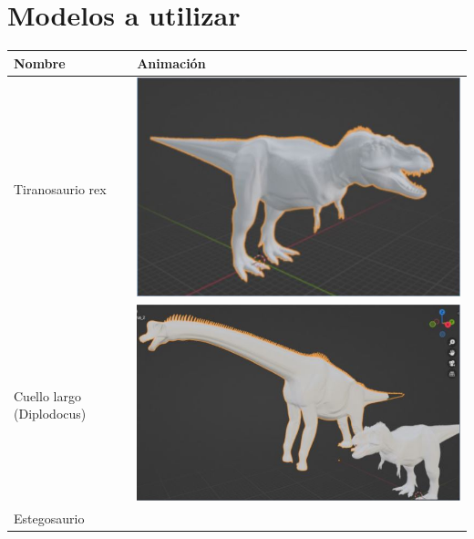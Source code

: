 \documentclass[12pt]{article} %
\begin{document}
	
	\newpage
	
	\section{Modelos a utilizar}
	
	\begin{center}
		\begin{tabular}{ | m{19em} | m{19em} | }
			\hline
			Nombre & Animación  \\ 
			\hline
		 	Tiranosaurio rex &
		 	\includegraphics[scale=0.5]{images/Tiranosaurio.JPG} \\  
		 	\hline
		 	Cuello largo (Diplodocus) &
		 	\includegraphics[scale=0.5]{images/Diplodocus.JPG} \\
		 	\hline
		 	Estegosaurio &

\end{tabular}
\end{center}
\end{document}
